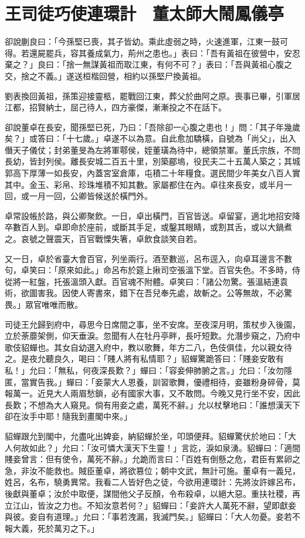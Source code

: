 
\chapter{王司徒巧使連環計　董太師大鬧鳳儀亭}

卻說蒯良曰：「今孫堅已喪，其子皆幼。乘此虛弱之時，火速進軍，江東一鼓可得。若還屍罷兵，容其養成氣力，荊州之患也。」表曰：「吾有黃祖在彼營中，安忍棄之？」良曰：「捨一無謀黃祖而取江東，有何不可？」表曰：「吾與黃祖心腹之交，捨之不義。」遂送桓楷回營，相約以孫堅尸換黃祖。

劉表換回黃祖，孫策迎接靈柩，罷戰回江東，葬父於曲阿之原。喪事已畢，引軍居江都，招賢納士，屈己待人，四方豪傑，漸漸投之不在話下。

卻說董卓在長安，聞孫堅已死，乃曰：「吾除卻一心腹之患也！」問：「其子年幾歲矣？」或答曰：「十七歲。」卓遂不以為意。自此愈加驕橫，自號為「尚父」，出入僭天子儀仗；封弟董旻為左將軍鄠侯，姪董璜為待中，總領禁軍。董氏宗族，不問長幼，皆封列侯。離長安城二百五十里，別築郿塢，役民夫二十五萬人築之；其城郭高下厚薄一如長安，內蓋宮室倉庫，屯積二十年糧食。選民間少年美女八百人實其中。金玉、彩帛、珍珠堆積不知其數。家屬都住在內。卓往來長安，或半月一回，或一月一回，公卿皆候送於橫門外。

卓常設帳於路，與公卿聚飲。一日，卓出橫門，百官皆送。卓留宴，適北地招安降卒數百人到。卓即命於座前，或斷其手足，或鑿其眼睛，或割其舌，或以大鍋煮之。哀號之聲震天，百官戰慄失箸，卓飲食談笑自若。

又一日，卓於省臺大會百官，列坐兩行。酒至數巡，呂布逕入，向卓耳邊言不數句，卓笑曰：「原來如此。」命呂布於筵上揪司空張溫下堂。百官失色。不多時，侍從將一紅盤，托張溫頭入獻。百官魂不附體。卓笑曰：「諸公勿驚。張溫結連袁術，欲圖害我。因使人寄書來，錯下在吾兒奉先處，故斬之。公等無故，不必驚畏。」眾官唯唯而散。

司徒王允歸到府中，尋思今日席間之事，坐不安席。至夜深月明，策杖步入後園，立於荼蘼架側，仰天垂淚。忽聞有人在牡丹亭畔，長吁短歎。允潛步窺之，乃府中歌伎貂蟬也。其女自幼選入府中，教以歌舞，年方二八，色伎俱佳，允以親女待之。是夜允聽良久，喝曰：「賤人將有私情耶？」貂蟬驚跪答曰：「賤妾安敢有私！」允曰：「無私，何夜深長歎？」蟬曰：「容妾伸肺腑之言。」允曰：「汝勿隱匿，當實告我。」蟬曰：「妾蒙大人恩養，訓習歌舞，優禮相待，妾雖粉身碎骨，莫報萬一。近見大人兩眉愁鎖，必有國家大事，又不敢問。今晚又見行坐不安，因此長歎；不想為大人窺見。倘有用妾之處，萬死不辭。」允以杖擊地曰：「誰想漢天下卻在汝手中耶！隨我到畫閣中來。」

貂蟬跟允到閣中，允盡叱出婢妾，納貂蟬於坐，叩頭便拜。貂蟬驚伏於地曰：「大人何故如此？」允曰：「汝可憐大漢天下生靈！」言訖，淚如泉湧。貂蟬曰：「適間賤妾曾言：但有使令，萬死不辭。」允跪而言曰：「百姓有倒懸之危，君臣有累卵之急，非汝不能救也。賊臣董卓，將欲篡位；朝中文武，無計可施。董卓有一義兒，姓呂，名布，驍勇異常。我看二人皆好色之徒，今欲用連環計：先將汝許嫁呂布，後獻與董卓；汝於中取便，謀間他父子反顏，令布殺卓，以絕大惡。重扶社稷，再立江山，皆汝之力也。不知汝意若何？」貂蟬曰：「妾許大人萬死不辭，望即獻妾與彼。妾自有道理。」允曰：「事若洩漏，我滅門矣。」貂蟬曰：「大人勿憂。妾若不報大義，死於萬刃之下。」

